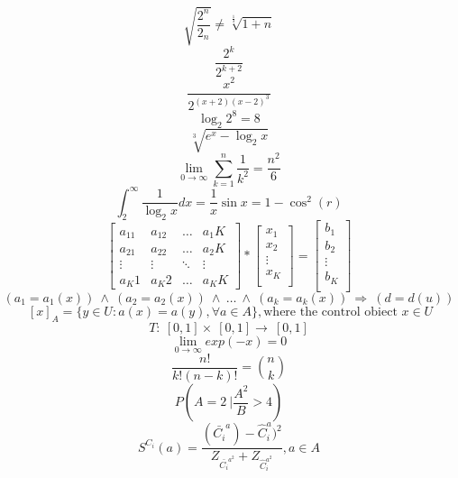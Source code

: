 \documentclass[11pt,a4paper]{article}
\begin{document}
$$ \sqrt{ \frac{2^{n}}{2_n}} \neq \sqrt[\frac{1}{3}]{1+n} $$
$$ \frac{2^{k}}{2^{k+2}} $$
$$ \frac{x^{2}}{2^{(x+2)(x-2)^{3}}} $$
$$ \log_2 {2^{8}} = 8 $$
$$ \sqrt[3]{e^{x}-\log_2{x}} $$
$$ \lim_{0\to\infty}\sum_{k=1}^n\frac{1}{k^{2}} = \frac{n^{2}}{6} $$
$$ \int_{2}^{\infty} \frac{1}{\log_2{x}} dx=\frac{1}{x}\sin {x} = 1 - \cos^{2}{(r)}$$
$$ \left[
\begin{array}{cccc}
a_11 & a_12 & \ldots & a_1K \\
a_21 & a_22 & \ldots & a_2K \\
\vdots & \vdots & \ddots &\vdots \\
a_K1 & a_K2 & \ldots & a_KK
\end{array} \right]
*
\left[
\begin{array}{c}
x_1  \\
x_2  \\
\vdots \\
x_K \\
\end{array} 
\right]
=
\left[
\begin{array}{c}
b_1  \\
b_2  \\
\vdots \\
b_K \\
\end{array} 
\right]
$$
$$ (a_1 = a_1(x)) \ \wedge \ (a_2 = a_2(x)) \ \wedge \ \ldots \ \wedge \
(a_k = a_k(x)) \ \Rightarrow \  (d = d(u))$$
$$ \ [ x ]_{A}  = \{ y\in U : a(x)=a(y), \forall a\in A \}, \textrm{where the control obiect } x\in U  $$
$$ T: \ [ 0,1 ] \times \ [ 0,1 ] \rightarrow \ [ 0,1 ] $$
$$ \lim_{0\to\infty} exp(-x)=0 $$
$$ \frac{n!}{k!(n-k)!} = {n \choose k}$$
$$ P \left( A=2\ | \frac{A^{2}}{B}  >4 \right) $$
$$ S^{C_i}(a)=\frac{(\bar{C_i}^{a})-\hat{C}_{i}^{a})^{2}}{Z_{\bar{C_i}^{a^2}} + 
Z_{\hat{C}_{i}^{a^2}}}, a\in A $$
\end{document}

